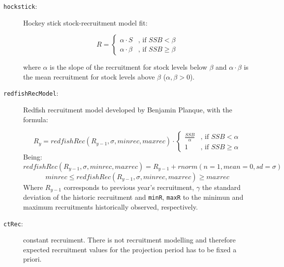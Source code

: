 	\begin{description}

		\item[\texttt{hockstick}:] Hockey stick stock-recruitment model fit:

              \[
 							R = \begin{cases}
   									\alpha\cdot S         & \text{, if } SSB < \beta \\
   									\alpha\cdot \beta     & \text{, if } SSB \geq \beta
  								\end{cases}
							\]

          where $\alpha$ is the slope of the recruitment for stock levels below
          $\beta$ and $\alpha\cdot \beta $ is the mean recruitment for stock levels above
          $\beta$ ($\alpha, \beta > 0$).

		\item[\texttt{redfishRecModel}:] Redfish recruitment model developed by Benjamin Planque, with the formula:

          \[
          R_y = redfishRec(R_{y-1},\sigma, minrec, maxrec) \cdot
            \begin{cases}
              \frac {SSB} \alpha  & \text{, if } SSB < \alpha \\
              1                   & \text{, if } SSB \geq \alpha
            \end{cases}
          \]
          Being:
            $$redfishRec(R_{y-1},\sigma, minrec, maxrec) = R_{y-1} + rnorm(n=1,mean=0,sd=\sigma)$$
            $$minrec \leq redfishRec(R_{y-1},\sigma, minrec, maxrec) \geq maxrec$$
          Where $R_{y-1}$ corresponds to previous year's recruitment, $\gamma$ the standard deviation of
          the historic recruitment and \texttt{minR}, \texttt{maxR}
          to the minimun and maximum recruitments historically observed, respectively.


    \item[\texttt{ctRec}:] constant recruiment. There is not recruitment modelling and therefore expected
        recruitment values for the projection period has to be fixed a priori.

  \end{description}

